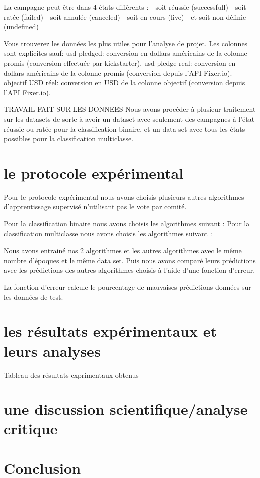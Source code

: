 \documentclass{article}
\begin{document}
La campagne peut-être dans 4 états différents : 
- soit réussie (successfull)
- soit ratée (failed)
- soit annulée (canceled)
- soit en cours (live)
- et soit non définie (undefined)

Vous trouverez les données les plus utiles pour l'analyse de projet. Les colonnes sont explicites sauf:
usd pledged: conversion en dollars américains de la colonne promis (conversion effectuée par kickstarter).
usd pledge real: conversion en dollars américains de la colonne promis (conversion depuis l'API Fixer.io).
objectif USD réel: conversion en USD de la colonne objectif (conversion depuis l'API Fixer.io).

TRAVAIL FAIT SUR LES DONNEES
Nous avons procéder à plusieur traitement sur les datasets de sorte à avoir un dataset avec seulement des campagnes à l'état réussie ou ratée pour la classification binaire, et un data set avec tous les états possibles pour la classification multiclasse. 

\section{le protocole expérimental}
Pour le protocole expérimental nous avons choisis plusieurs autres algorithmes d'apprentissage supervisé n'utilisant pas le vote par comité. 

Pour la classification binaire nous avons choisis les algorithmes suivant : 
Pour la classification multiclasse nous avons choisis les algorithmes suivant : 

Nous avons entrainé nos 2 algorithmes et les autres algorithmes avec le même nombre d'époques et le même data set. 
Puis nous avons comparé leurs prédictions avec les prédictions des autres algorithmes choisis à l'aide d'une fonction d'erreur.

La fonction d'erreur calcule le pourcentage de mauvaises prédictions données sur les données de test. 

\section{les résultats expérimentaux et leurs analyses}
Tableau des résultats exprimentaux obtenus

\section{une discussion scientifique/analyse critique}

\section{Conclusion}



\end{document}
